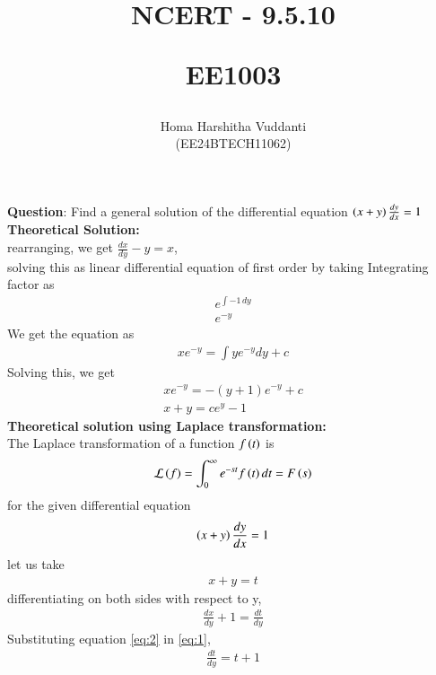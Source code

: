 \documentclass[journal]{IEEEtran}
\begin{document}


\title{
NCERT - 9.5.10

\large{EE1003}
}
\author{Homa Harshitha Vuddanti

(EE24BTECH11062)
}	

\maketitle

\bigskip

\renewcommand{\thefigure}{\theenumi}
\renewcommand{\thetable}{\theenumi}
\textbf{Question}: Find a general solution of the differential equation
$\left(x+y\right)\frac{dy}{dx}=1$\\
\textbf{Theoretical Solution:} \\
rearranging, we get $\frac{dx}{dy}-y=x$, \\
solving this as linear differential equation of first order by taking Integrating factor as\\
\begin{align}
e^{\int -1 \, dy}\\
e^{-y}
\end{align} We get the equation as 
\begin{align}
xe^{-y}=\int ye^{-y}dy +c
\end{align}
Solving this, we get 
\begin{align}
xe^{-y}=-(y+1)e^{-y}+c\\
x+y=ce^y-1
\end{align}
\textbf{Theoretical solution using Laplace transformation:}\\
The Laplace transformation of a function $f\left(t\right)$ is
\begin{align}
\mathcal{L}\left(f\right)=\int_{0}^{\infty} e^{-st}f\left(t\right) dt=F\left(s\right)
\end{align}
for the given differential equation 
\begin{align}
\left(x+y\right)\frac{dy}{dx}=1 \label{eq:1}
\end{align}
let us take
\begin{align}
x+y=t
\end{align}
differentiating on both sides with respect to y,
\begin{align}
\frac{dx}{dy}+1=\frac{dt}{dy}\label{eq:2}
\end{align}
Substituting equation \eqref{eq:2} in \eqref{eq:1},
\begin{align}
\frac{dt}{dy}=t+1
\end{align}
\end{document}
